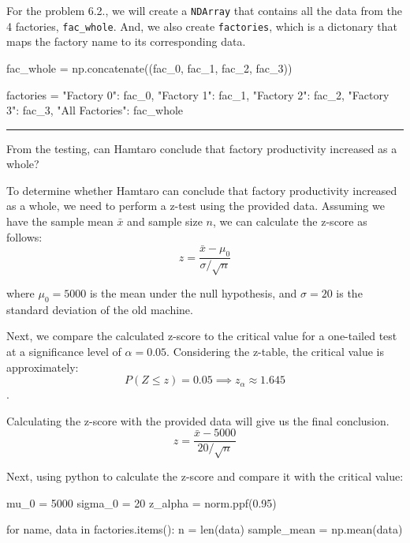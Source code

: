 \documentclass[a4paper, 10pt]{article}
\begin{document}
\begin{tosubmit}
For the problem 6.2., we will create a \texttt{NDArray} that contains all the data from the 4 factories, \texttt{fac\_whole}.
And, we also create \texttt{factories}, which is a dictonary that maps the factory name to its corresponding data.

\begin{codingbox}
fac_whole = np.concatenate((fac_0, fac_1, fac_2, fac_3))

factories = {
    "Factory 0": fac_0,
    "Factory 1": fac_1,
    "Factory 2": fac_2,
    "Factory 3": fac_3,
    "All Factories": fac_whole
}
\end{codingbox}

\vspace{3mm} \hrule \vspace{3mm}

\begin{subproblems}[resume]
    \item From the testing, can Hamtaro conclude that factory productivity increased as a whole?
\end{subproblems}

\par\noindent\submitsolution
To determine whether Hamtaro can conclude that factory productivity increased as a whole, we need to perform a z-test using the provided data.
Assuming we have the sample mean \( \bar{x} \) and sample size \( n \), we can calculate the z-score as follows:
\[ z = \frac{\bar{x} - \mu_0}{\sigma / \sqrt{n}} \]

where \( \mu_0 = 5000 \) is the mean under the null hypothesis, and \( \sigma = 20 \) is the standard deviation of the old machine.

\vspace{2mm}

Next, we compare the calculated z-score to the critical value for a one-tailed test at a significance level of \( \alpha = 0.05 \).
Considering the z-table, the critical value is approximately:
\[ P(Z \leq z) = 0.05 \implies z_{\alpha} \approx 1.645 \].

Calculating the z-score with the provided data will give us the final conclusion.
\[ z = \frac{\bar{x} - 5000}{20 / \sqrt{n}} \]

Next, using python to calculate the z-score and compare it with the critical value:
\begin{codingbox}
mu_0 = 5000
sigma_0 = 20
z_alpha = norm.ppf(0.95)

for name, data in factories.items():
    n = len(data)
    sample_mean = np.mean(data)


\end{codingbox}
\end{tosubmit}
\end{document}

